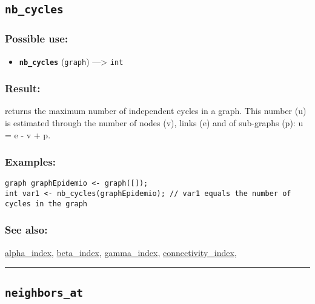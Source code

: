 \documentclass[]{book}
\providecommand{\tightlist}{%
  \setlength{\itemsep}{0pt}\setlength{\parskip}{0pt}}
\theoremstyle{definition}
\theoremstyle{definition}
\theoremstyle{definition}
\theoremstyle{remark}
\begin{document}
\subsection{\texorpdfstring{\texttt{nb\_cycles}}{nb\_cycles}}\label{nb_cycles}

\subsubsection{Possible use:}\label{possible-use-365}

\begin{itemize}
\tightlist
\item
  \textbf{\texttt{nb\_cycles}} (\texttt{graph}) ---\textgreater{}
  \texttt{int}
\end{itemize}

\subsubsection{Result:}\label{result-353}

returns the maximum number of independent cycles in a graph. This number
(u) is estimated through the number of nodes (v), links (e) and of
sub-graphs (p): u = e - v + p.

\subsubsection{Examples:}\label{examples-252}

\begin{verbatim}
graph graphEpidemio <- graph([]);  
int var1 <- nb_cycles(graphEpidemio); // var1 equals the number of cycles in the graph
\end{verbatim}

\subsubsection{See also:}\label{see-also-145}

\href{OperatorsAA\#alpha_index}{alpha\_index},
\href{OperatorsBC\#beta_index}{beta\_index},
\href{OperatorsDH\#gamma_index}{gamma\_index},
\href{OperatorsBC\#connectivity_index}{connectivity\_index},

\begin{center}\rule{0.5\linewidth}{\linethickness}\end{center}

\subsection{\texorpdfstring{\texttt{neighbors\_at}}{neighbors\_at}}\label{neighbors_at}
\end{document}
